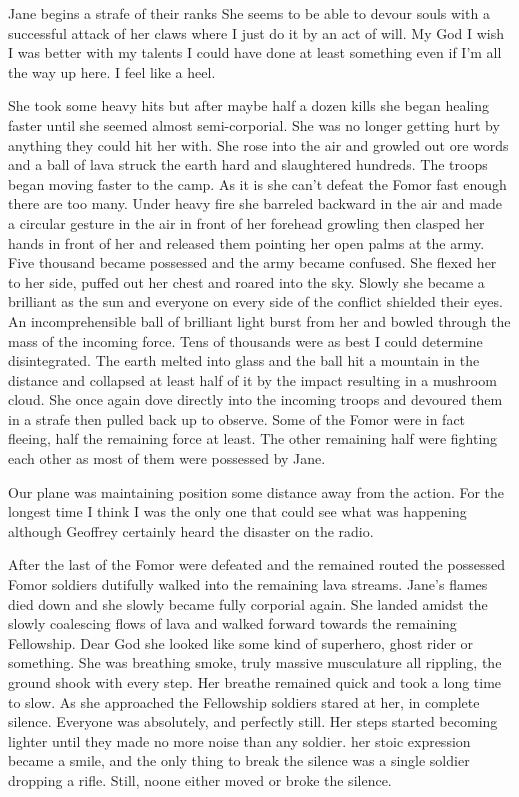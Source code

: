 Jane begins a strafe of their ranks She seems to be able to devour souls with a successful attack of her claws where I just do it by an act of will. My God I wish I was better with my talents I could have done at least something even if I'm all the way up here. I feel like a heel.

She took some heavy hits but after maybe half a dozen kills she began healing faster until she seemed almost semi-corporial. She was no longer getting hurt by anything they could hit her with. She rose into the air and growled out ore words \enochianxx and a ball of lava struck the earth hard and slaughtered hundreds. The troops began moving faster to the camp. As it is she can't defeat the Fomor fast enough there are too many. Under heavy fire she barreled backward in the air and made a circular gesture in the air in front of her forehead growling \enochianxx then clasped her hands in front of her and released them pointing her open palms at the army. Five thousand became possessed and the army became confused. She flexed her to her side, puffed out her chest and roared into the sky. Slowly she became a brilliant as the sun and everyone on every side of the conflict shielded their eyes. An incomprehensible ball of brilliant light burst from her and bowled through the mass of the incoming force. Tens of thousands were as best I could determine disintegrated. The earth melted into glass and the ball hit a mountain in the distance and collapsed at least half of it by the impact resulting in a mushroom cloud. She once again dove directly into the incoming troops and devoured them in a strafe then pulled back up to observe. Some of the Fomor were in fact fleeing, half the remaining force at least. The other remaining half were fighting each other as most of them were possessed by Jane.

Our plane was maintaining position some distance away from the action. For the longest time I think I was the only one that could see what was happening although Geoffrey certainly heard the disaster on the radio.

After the last of the Fomor were defeated and the remained routed the possessed Fomor soldiers dutifully walked into the remaining lava streams. Jane's flames died down and she slowly became fully corporial again. She landed amidst the slowly coalescing flows of lava and walked forward towards the remaining Fellowship. Dear God she looked like some kind of superhero, ghost rider or something. She was breathing smoke, truly massive musculature all rippling, the ground shook with every step. Her breathe remained quick and took a long time to slow. As she approached the Fellowship soldiers stared at her, in complete silence. Everyone was absolutely, and perfectly still. Her steps started becoming lighter until they made no more noise than any soldier. her stoic expression became a smile, and the only thing to break the silence
was a single soldier dropping a rifle. Still, noone either moved or broke the silence.

